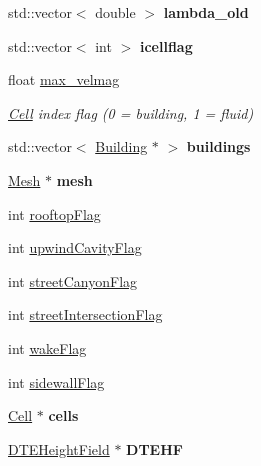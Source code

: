 \begin{DoxyCompactItemize}
std\+::vector$<$ double $>$ {\bfseries lambda\+\_\+old}
\item 
\mbox{\label{classSolver_af7773bf4c9fce880f071bd47ba2bcf28}} 
std\+::vector$<$ int $>$ {\bfseries icellflag}
\item 
\mbox{\label{classSolver_a3c7a2b93b76bc0c219740988e8f0bbe3}} 
float \hyperlink{classSolver_a3c7a2b93b76bc0c219740988e8f0bbe3}{max\+\_\+velmag}
\begin{DoxyCompactList}\small\item\em \hyperlink{classCell}{Cell} index flag (0 = building, 1 = fluid) \end{DoxyCompactList}\item 
\mbox{\label{classSolver_a560d2a46322206e831c0395f3933f1b0}} 
std\+::vector$<$ \hyperlink{classBuilding}{Building} $\ast$ $>$ {\bfseries buildings}
\item 
\mbox{\label{classSolver_a9b516765134fb4193329639761924cf7}} 
\hyperlink{classMesh}{Mesh} $\ast$ {\bfseries mesh}
\item 
int \hyperlink{classSolver_ada5e48b402bea1092dc90d2fa7d374e9}{rooftop\+Flag}
\item 
int \hyperlink{classSolver_a597d486a292558f5f55db306eeec42d1}{upwind\+Cavity\+Flag}
\item 
int \hyperlink{classSolver_af05b7600810c10dbf97b926bd67b71da}{street\+Canyon\+Flag}
\item 
int \hyperlink{classSolver_ad30bcedb245dc79e937cbf7776fc27d7}{street\+Intersection\+Flag}
\item 
int \hyperlink{classSolver_a5de7954b3723e984ef9c4963dfedcb04}{wake\+Flag}
\item 
int \hyperlink{classSolver_a243552b62125c493cd0f08f3bbfe3723}{sidewall\+Flag}
\item 
\mbox{\label{classSolver_a21a65352d2b9fe246309a54a1fb916c0}} 
\hyperlink{classCell}{Cell} $\ast$ {\bfseries cells}
\item 
\mbox{\label{classSolver_a0a19a30f249bc14ce15915c2cb533f7f}} 
\hyperlink{classDTEHeightField}{D\+T\+E\+Height\+Field} $\ast$ {\bfseries D\+T\+E\+HF}
\item 
\mbox{\label{classSolver_a65a58db8e3b6ff0938f297d959298441}} 

\end{DoxyCompactItemize}
